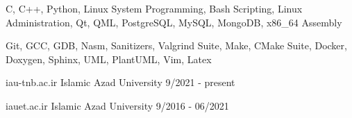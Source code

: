 \documentclass[a4paper,12pt]{memoir} %
\begin{document}


{C, C++, Python, Linux System Programming,
Bash Scripting, Linux Administration, Qt, QML,
PostgreSQL, MySQL, MongoDB, x86\_64 Assembly}


\SmallSep %


{Git, GCC, GDB, Nasm, Sanitizers, Valgrind Suite,
Make, CMake Suite, Docker, Doxygen, Sphinx, UML,
PlantUML, Vim, Latex}


\Sep %




{iau-tnb.ac.ir}
{Islamic Azad University}
{9/2021 - present}

{iauet.ac.ir}
{Islamic Azad University}
{9/2016 - 06/2021}


\Sep %




\end{document}
